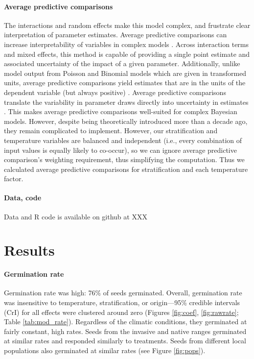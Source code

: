 \documentclass[12pt]{article}\usepackage[]{graphicx}\usepackage[]{color}
\begin{document}
	
	\paragraph{Average predictive comparisons} The interactions and random effects make this model complex, and frustrate clear interpretation of parameter estimates. Average predictive comparisons can increase interpretability of variables in complex models \parencite{Gelman2007}. Across interaction terms and mixed effects, this method is capable of providing a single point estimate and associated uncertainty of the impact of a given parameter. Additionally, unlike model output from Poisson and Binomial models which are given in transformed units, average predictive comparisons yield estimates that are in the units of the dependent variable (but always positive) \parencite{Gelman2007}. Average predictive comparisons translate the variability in parameter draws directly into uncertainty in estimates \parencite{Gelman2007}. This makes average predictive comparisons well-suited for complex Bayesian models. However, despite being theoretically introduced more than a decade ago, they remain complicated to implement. However, our stratification and temperature variables are balanced and independent  (i.e., every combination of input values is equally likely to co-occur), so we can ignore average predictive comparison's weighting requirement, thus simplifying the computation. Thus we calculated average predictive comparisons for stratification and each temperature factor.
	
	\paragraph{Data, code} 
	Data and R code is available on github at XXX
	\section{Results} 
	\paragraph{Germination rate} Germination rate was high: 76\% of seeds germinated. Overall, germination rate was insensitive to temperature, stratification, or origin---95\% credible intervals (CrI) for all effects were clustered around zero (Figures \ref{fig:coef}, \ref{fig:rawrate}; Table \ref{tab:mod_rate}). Regardless of the climatic conditions, they germinated at fairly constant, high rates. Seeds from the invasive and native ranges germinated at similar rates and responded similarly to treatments. Seeds from different local populations also germinated at similar rates (see Figure \ref{fig:pops}).
\end{document}
